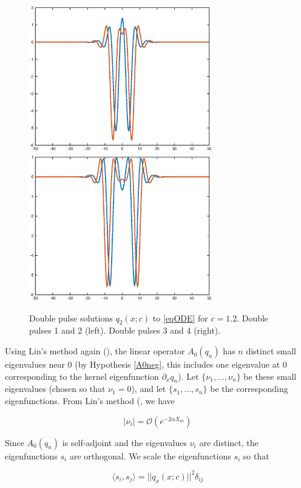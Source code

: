 \documentclass[12pt]{article}
\begin{document}
\begin{figure}[H]
\label{fig:double}
\centering
\includegraphics[width=8cm]{double12_12.eps}
\includegraphics[width=8cm]{double12_34.eps}
\caption{Double pulse solutions $q_2(x; c)$ to \eqref{eqODE} for $c = 1.2$. Double pulses 1 and 2 (left). Double pulses 3 and 4 (right).}
\end{figure}

Using Lin's method again (\cite{Sandstede1998}), the linear operator $A_0(q_n)$ has $n$ distinct small eigenvalues near 0 (by Hypothesis \ref{A0neg}, this includes one eigenvalue at 0 corresponding to the kernel eigenfunction $\partial_x q_n$). Let $\{\nu_1, \dots, \nu_n\}$ be these small eigenvalues (chosen so that $\nu_1 = 0$), and let $\{s_1, \dots, s_n \}$ be the corresponding eigenfunctions. From Lin's method (\cite{Sandstede1998}, we have

\begin{equation}
|\nu_i| = \mathcal{O}(e^{-2 \alpha X_m})
\end{equation}

Since $A_0(q_n)$ is self-adjoint and the eigenvalues $\nu_i$ are distinct, the eigenfunctions $s_i$ are orthogonal. We scale the eigenfunctions $s_i$ so that

\begin{equation}\label{orthonormaleigs}
\langle s_i, s_j \rangle = ||q_x(x; c)||^2 \delta_{ij}
\end{equation}
\end{document}
